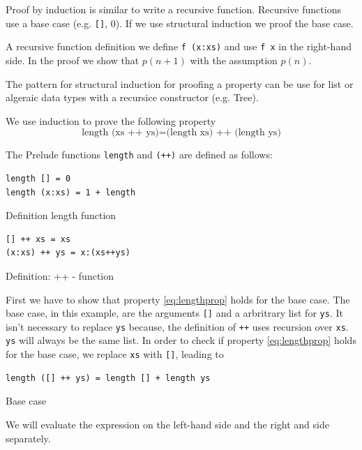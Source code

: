 \documentclass[twoside, a4paper]{article}
\begin{document}
Proof by induction is similar to write a recursive function. Recursive functions use a base case (e.g. \verb|[]|, 0). 
If we use structural induction we proof the base case.

A recursive function definition we define \verb|f (x:xs)| and use \verb|f x| in the right-hand side. In the proof we show that $p(n+1)$ with the assumption $p(n)$.

The pattern for structural induction for proofing a property can be use for list or algeraic data types with a recursice constructor (e.g. Tree).

We use induction to prove the following property
\begin{equation}
  \label{eq:lengthprop}
  \text{length (xs ++ ys)} = \text{(length xs) ++ (length ys)}
\end{equation}

The Prelude functions \verb|length| and \verb|(++)| are defined as follows:
\begin{program}
\begin{verbatim}
length [] = 0
length (x:xs) = 1 + length 
\end{verbatim}
\caption{Definition length function}
\label{lst:lengthdefinition}  
\end{program}

\begin{program}
\begin{verbatim}
[] ++ xs = xs
(x:xs) ++ ys = x:(xs++ys)
\end{verbatim}
\caption{Definition: ++ - function}
\label{lst:catdefinition}  
\end{program}

First we have to show that property \ref{eq:lengthprop} holds for the base case. The base case, in this example, are the arguments \verb|[]| and a arbritrary list for \verb|ys|. It isn't necessary to replace \verb|ys| because, the definition of \verb|++| uses recursion over \verb|xs|. \verb|ys| will always be the same list.
In order to check if property \ref{eq:lengthprop} holds for the base case, we replace \verb|xs| with  \verb|[]|, leading to

\begin{program}
\begin{verbatim}
length ([] ++ ys) = length [] + length ys
\end{verbatim}
\caption{Base case}
\label{lst:equality1}
\end{program}

We will evaluate the expression on the left-hand side and the right and side separately.
\end{document}
